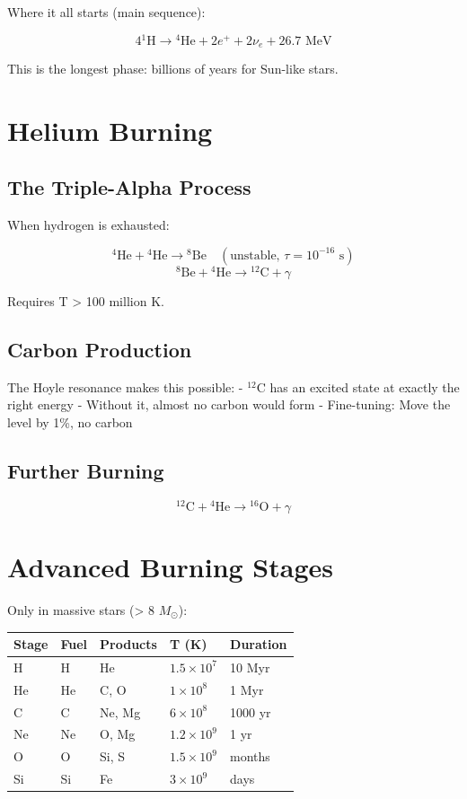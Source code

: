 \documentclass[
  11pt,
  letterpaper,
  twoside,
  openright]{book}
\begin{document}
Where it all starts (main sequence):

\[
4{^1\text{H}} \rightarrow {^4\text{He}} + 2e^+ + 2\nu_e + 26.7 \text{ MeV}
\]

This is the longest phase: billions of years for Sun-like stars.

\section{Helium Burning}\label{helium-burning}

\subsection{The Triple-Alpha Process}\label{the-triple-alpha-process}

When hydrogen is exhausted:

\[
{^4\text{He}} + {^4\text{He}} \rightarrow {^8\text{Be}} \quad (\text{unstable, } \tau = 10^{-16} \text{ s})
\] \[
{^8\text{Be}} + {^4\text{He}} \rightarrow {^{12}\text{C}} + \gamma
\]

Requires T \textgreater{} 100 million K.

\subsection{Carbon Production}\label{carbon-production}

The Hoyle resonance makes this possible: - \(^{12}\)C has an excited
state at exactly the right energy - Without it, almost no carbon would
form - Fine-tuning: Move the level by 1\%, no carbon

\subsection{Further Burning}\label{further-burning}

\[
{^{12}\text{C}} + {^4\text{He}} \rightarrow {^{16}\text{O}} + \gamma
\]

\section{Advanced Burning Stages}\label{advanced-burning-stages}

Only in massive stars (\textgreater{} 8 \(M_\odot\)):

\begin{longtable}[]{@{}lllll@{}}
\toprule\noalign{}
Stage & Fuel & Products & T (K) & Duration \\
\midrule\noalign{}
\endhead
\bottomrule\noalign{}
\endlastfoot
H & H & He & \(1.5 \times 10^7\) & 10 Myr \\
He & He & C, O & \(1 \times 10^8\) & 1 Myr \\
C & C & Ne, Mg & \(6 \times 10^8\) & 1000 yr \\
Ne & Ne & O, Mg & \(1.2 \times 10^9\) & 1 yr \\
O & O & Si, S & \(1.5 \times 10^9\) & months \\
Si & Si & Fe & \(3 \times 10^9\) & days \\
\end{longtable}
\end{document}
